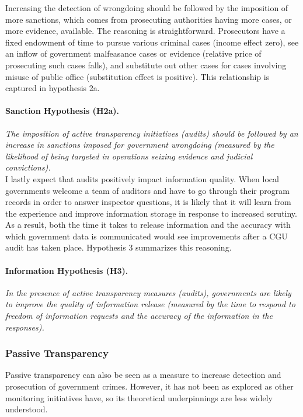 \documentclass[11pt]{article}
\begin{document}
Increasing the detection of wrongdoing should be followed by the imposition of more sanctions, which comes from prosecuting authorities having more cases, or more evidence, available. The reasoning is straightforward. Prosecutors have a fixed endowment of time to pursue various criminal cases (income effect zero), see an inflow of government malfeasance cases or evidence (relative price of prosecuting such cases falls), and substitute out other cases for cases involving misuse of public office (substitution effect is positive). This relationship is captured in hypothesis 2a.

\paragraph{Sanction Hypothesis (H2a).} \emph{The imposition of active transparency initiatives (audits) should be followed by an increase in sanctions imposed for government wrongdoing (measured by the likelihood of being targeted in operations seizing evidence and judicial convictions).} \\

I lastly expect that audits positively impact information quality. When local governments welcome a team of auditors and have to go through their program records in order to answer inspector questions, it is likely that it will learn from the experience and improve information storage in response to increased scrutiny. As a result, both the time it takes to release information and the accuracy with which government data is communicated would see improvements after a CGU audit has taken place. Hypothesis 3 summarizes this reasoning.

\paragraph{Information Hypothesis (H3).} \emph{In the presence of active transparency measures (audits), governments are likely to improve the quality of information release (measured by the time to respond to freedom of information requests and the accuracy of the information in the responses).}

\subsubsection{Passive Transparency} \label{subsubsec:theory2_paper3}

Passive transparency can also be seen as a measure to increase detection and prosecution of government crimes. However, it has not been as explored as other monitoring initiatives have, so its theoretical underpinnings are less widely understood.
\end{document}
